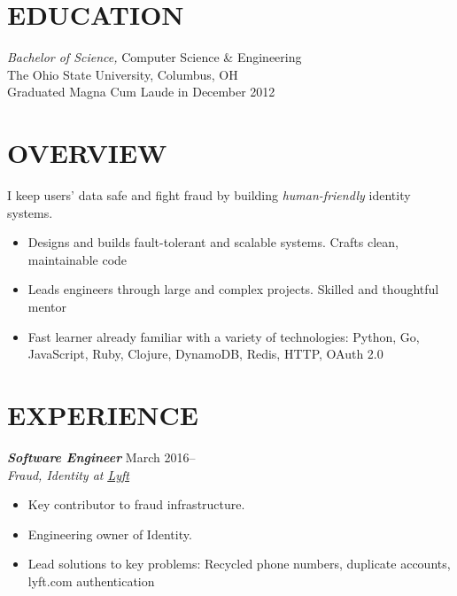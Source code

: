 \documentclass[line,letterpaper]{resume}
\begin{document}
\address{\href{https://www.ryanmcg.com}{Personal website --- https://www.ryanmcg.com}}
\address{\href{mailto:ryan@ryanmcg.com}{ryan@ryanmcg.com}}


\begin{resume}
    \vspace{-24pt}
    \section{\uppercase{Education}} {\sl Bachelor of Science,} \/
    Computer Science \& Engineering \\
    The Ohio State University, Columbus, OH \\
    Graduated Magna Cum Laude in December 2012 \\

    \vspace{-20pt}

    \section{\uppercase{Overview}}
    I keep users' data safe and fight fraud by building \emph{human-friendly} identity systems.
    \begin{itemize}
        \item Designs and builds fault-tolerant and scalable systems. Crafts clean, maintainable code
        \item Leads engineers through large and complex projects. Skilled and thoughtful mentor
        \item Fast learner already familiar with a variety of technologies: Python, Go, JavaScript,
            Ruby, Clojure, DynamoDB, Redis, HTTP, OAuth 2.0
    \end{itemize}

    \vspace{-6pt}

    \section{\uppercase{Experience}}

    {\sl\textbf{Software Engineer}} \hfill March 2016--\\
    \emph{Fraud, Identity at
    \underline{\href{https://www.lyft.com/}{Lyft}}}
    \begin{itemize}
        \item Key contributor to fraud infrastructure.
        \item Engineering owner of Identity.
        \item Lead solutions to key problems: Recycled phone numbers, duplicate
            accounts, lyft.com authentication
    \end{itemize}
    \vspace{-6pt}


\end{resume}
\end{document}
